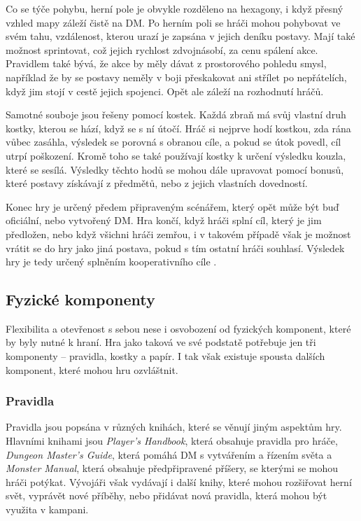 Co se týče pohybu, herní pole je obvykle rozděleno na hexagony, i když přesný vzhled mapy záleží čistě na DM. Po herním poli se hráči mohou pohybovat ve svém tahu, vzdálenost, kterou urazí je zapsána v jejich deníku postavy. Mají také možnost sprintovat, což jejich rychlost zdvojnásobí, za cenu spálení akce. Pravidlem také bývá, že akce by měly dávat z prostorového pohledu smysl, například že by se postavy neměly v boji přeskakovat ani střílet po nepřátelích, když jim stojí v cestě jejich spojenci. Opět ale záleží na rozhodnutí hráčů.

Samotné souboje jsou řešeny pomocí kostek. Každá zbraň má svůj vlastní druh kostky, kterou se hází, když se s ní útočí. Hráč si nejprve hodí kostkou, zda rána vůbec zasáhla, výsledek se porovná s obranou cíle, a pokud se útok povedl, cíl utrpí poškození. Kromě toho se také používají kostky k určení výsledku kouzla, které se sesílá. Výsledky těchto hodů se mohou dále upravovat pomocí bonusů, které postavy získávají z předmětů, nebo z jejich vlastních dovedností.

Konec hry je určený předem připraveným scénářem, který opět může být buď oficiální, nebo vytvořený DM. Hra končí, když hráči splní cíl, který je jim předložen, nebo když všichni hráči zemřou, i v takovém případě však je možnost vrátit se do hry jako jiná postava, pokud s tím ostatní hráči souhlasí. Výsledek hry je tedy určený splněním kooperativního cíle .

\subsection{Fyzické komponenty}
\label{subsec:dnd_components}

Flexibilita a otevřenost \dnd{} s sebou nese i osvobození od fyzických komponent, které by byly nutné k hraní. Hra jako taková ve své podstatě potřebuje jen tři komponenty -- pravidla, kostky a papír. I tak však existuje spousta dalších komponent, které mohou hru ozvláštnit.

\subsubsection*{Pravidla}
\label{subsubsec:dnd_comp_rules}

Pravidla \dnd{} jsou popsána v různých knihách, které se věnují jiným aspektům hry. Hlavními knihami jsou \textit{Player's Handbook}, která obsahuje pravidla pro hráče, \textit{Dungeon Master's Guide}, která pomáhá DM s vytvářením a řízením světa a \textit{Monster Manual}, která obsahuje předpřipravené příšery, se kterými se mohou hráči potýkat. Vývojáři však vydávají i další knihy, které mohou rozšiřovat herní svět, vyprávět nové příběhy, nebo přidávat nová pravidla, která mohou být využita v kampani.

